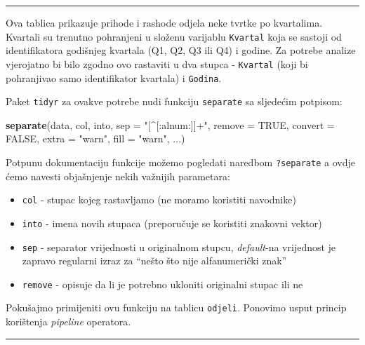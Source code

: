 \documentclass[]{book}
\newenvironment{Shaded}{\begin{snugshade}}{\end{snugshade}}
\newcommand{\KeywordTok}[1]{\textcolor[rgb]{0.13,0.29,0.53}{\textbf{#1}}}
\newcommand{\DataTypeTok}[1]{\textcolor[rgb]{0.13,0.29,0.53}{#1}}
\newcommand{\StringTok}[1]{\textcolor[rgb]{0.31,0.60,0.02}{#1}}
\newcommand{\OtherTok}[1]{\textcolor[rgb]{0.56,0.35,0.01}{#1}}
\newcommand{\NormalTok}[1]{#1}
\providecommand{\tightlist}{%
  \setlength{\itemsep}{0pt}\setlength{\parskip}{0pt}}
\theoremstyle{definition}
\theoremstyle{definition}
\theoremstyle{definition}
\theoremstyle{remark}
\begin{document}
\begin{center}\rule{0.5\linewidth}{\linethickness}\end{center}

Ova tablica prikazuje prihode i rashode odjela neke tvrtke po
kvartalima. Kvartali su trenutno pohranjeni u složenu varijablu
\texttt{Kvartal} koja se sastoji od identifikatora godišnjeg kvartala
(Q1, Q2, Q3 ili Q4) i godine. Za potrebe analize vjerojatno bi bilo
zgodno ovo rastaviti u dva stupca - \texttt{Kvartal} (koji bi
pohranjivao samo identifikator kvartala) i \texttt{Godina}.

Paket \texttt{tidyr} za ovakve potrebe nudi funkciju \texttt{separate}
sa sljedećim potpisom:

\begin{Shaded}
\begin{Highlighting}[]
\KeywordTok{separate}\NormalTok{(data, col, into, }\DataTypeTok{sep =} \StringTok{"[^[:alnum:]]+"}\NormalTok{, }\DataTypeTok{remove =} \OtherTok{TRUE}\NormalTok{,}
  \DataTypeTok{convert =} \OtherTok{FALSE}\NormalTok{, }\DataTypeTok{extra =} \StringTok{"warn"}\NormalTok{, }\DataTypeTok{fill =} \StringTok{"warn"}\NormalTok{, ...)}
\end{Highlighting}
\end{Shaded}

Potpunu dokumentaciju funkcije možemo pogledati naredbom
\texttt{?separate} a ovdje ćemo navesti objašnjenje nekih važnijih
parametara:

\begin{itemize}
\tightlist
\item
  \texttt{col} - stupac kojeg rastavljamo (ne moramo koristiti
  navodnike)
\item
  \texttt{into} - imena novih stupaca (preporučuje se koristiti znakovni
  vektor)
\item
  \texttt{sep} - separator vrijednosti u originalnom stupcu,
  \emph{default}-na vrijednost je zapravo regularni izraz za ``nešto što
  nije alfanumerički znak''
\item
  \texttt{remove} - opisuje da li je potrebno ukloniti originalni stupac
  ili ne
\end{itemize}

Pokušajmo primijeniti ovu funkciju na tablicu \texttt{odjeli}. Ponovimo
usput princip korištenja \emph{pipeline} operatora.

\begin{center}\rule{0.5\linewidth}{\linethickness}\end{center}
\end{document}
